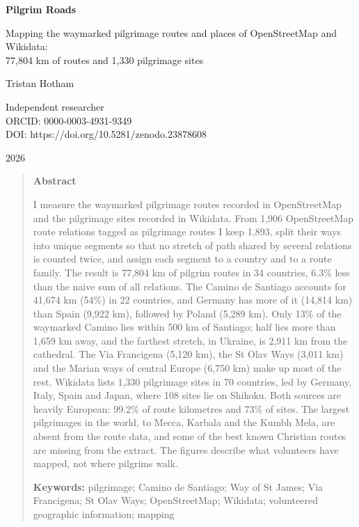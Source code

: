 \documentclass[11pt,a4paper]{article}
\begin{document}
\begin{center}
{\Large\bfseries Pilgrim Roads\par}
\vspace{0.4em}
{\large Mapping the waymarked pilgrimage routes and places of OpenStreetMap and Wikidata:\\77,804 km of routes and 1,330 pilgrimage sites\par}
\vspace{1.2em}
{\large Tristan Hotham\par}
\vspace{0.3em}
{\small Independent researcher\\
ORCID: 0000-0003-4931-9349\\
DOI: https://doi.org/10.5281/zenodo.23878608\par}
\vspace{0.8em}
2026
\end{center}

\begin{quote}
\small
\begin{center}\textbf{Abstract}\end{center}
I measure the waymarked pilgrimage routes recorded in OpenStreetMap and the pilgrimage sites recorded in Wikidata. From 1,906 OpenStreetMap route relations tagged as pilgrimage routes I keep 1,893, split their ways into unique segments so that no stretch of path shared by several relations is counted twice, and assign each segment to a country and to a route family. The result is 77,804 km of pilgrim routes in 34 countries, 6.3\% less than the naive sum of all relations. The Camino de Santiago accounts for 41,674 km (54\%) in 22 countries, and Germany has more of it (14,814 km) than Spain (9,922 km), followed by Poland (5,289 km). Only 13\% of the waymarked Camino lies within 500 km of Santiago; half lies more than 1,659 km away, and the farthest stretch, in Ukraine, is 2,911 km from the cathedral. The Via Francigena (5,120 km), the St Olav Ways (3,011 km) and the Marian ways of central Europe (6,750 km) make up most of the rest. Wikidata lists 1,330 pilgrimage sites in 70 countries, led by Germany, Italy, Spain and Japan, where 108 sites lie on Shikoku. Both sources are heavily European: 99.2\% of route kilometres and 73\% of sites. The largest pilgrimages in the world, to Mecca, Karbala and the Kumbh Mela, are absent from the route data, and some of the best known Christian routes are missing from the extract. The figures describe what volunteers have mapped, not where pilgrims walk.

\textbf{Keywords:} pilgrimage; Camino de Santiago; Way of St James; Via Francigena; St Olav Ways; OpenStreetMap; Wikidata; volunteered geographic information; mapping
\end{quote}
\end{document}
